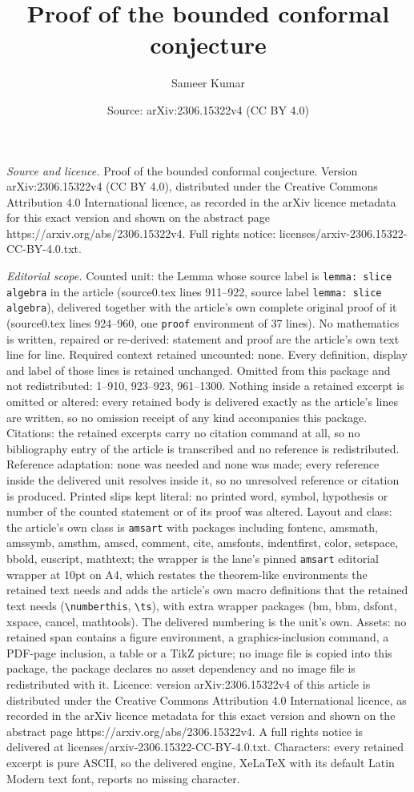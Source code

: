 \documentclass[10pt,a4paper]{amsart}
\title[Proof of the bounded conformal conjecture]{Proof of the bounded conformal conjecture}
\author{Sameer Kumar}
\date{Source: arXiv:2306.15322v4 (CC BY 4.0)}
\begin{document}
\maketitle

\noindent\emph{Source and licence.} Proof of the bounded conformal conjecture. Version arXiv:2306.15322v4 (CC BY 4.0), distributed under the Creative Commons Attribution 4.0 International licence, as recorded in the arXiv licence metadata for this exact version and shown on the abstract page https://arxiv.org/abs/2306.15322v4. Full rights notice: licenses/arxiv-2306.15322-CC-BY-4.0.txt.\par\smallskip

\noindent\textit{Editorial scope.} Counted unit: the Lemma whose source label is \texttt{lemma: slice algebra} in the article (source0.tex lines 911--922, source label \texttt{lemma: slice algebra}), delivered together with the article's own complete original proof of it (source0.tex lines 924--960, one \texttt{proof} environment of 37 lines). No mathematics is written, repaired or re-derived: statement and proof are the article's own text line for line. Required context retained uncounted: none. Every definition, display and label of those lines is retained unchanged. Omitted from this package and not redistributed: 1--910, 923--923, 961--1300. Nothing inside a retained excerpt is omitted or altered: every retained body is delivered exactly as the article's lines are written, so no omission receipt of any kind accompanies this package. Citations: the retained excerpts carry no citation command at all, so no bibliography entry of the article is transcribed and no reference is redistributed. Reference adaptation: none was needed and none was made; every reference inside the delivered unit resolves inside it, so no unresolved reference or citation is produced. Printed slips kept literal: no printed word, symbol, hypothesis or number of the counted statement or of its proof was altered. Layout and class: the article's own class is \texttt{amsart} with packages including fontenc, amsmath, amssymb, amsthm, amscd, comment, cite, amsfonts, indentfirst, color, setspace, bbold, euscript, mathtext; the wrapper is the lane's pinned \texttt{amsart} editorial wrapper at 10pt on A4, which restates the theorem-like environments the retained text needs and adds the article's own macro definitions that the retained text needs (\texttt{\textbackslash numberthis}, \texttt{\textbackslash ts}), with extra wrapper packages (bm, bbm, dsfont, xspace, cancel, mathtools). The delivered numbering is the unit's own. Assets: no retained span contains a figure environment, a graphics-inclusion command, a PDF-page inclusion, a table or a TikZ picture; no image file is copied into this package, the package declares no asset dependency and no image file is redistributed with it. Licence: version arXiv:2306.15322v4 of this article is distributed under the Creative Commons Attribution 4.0 International licence, as recorded in the arXiv licence metadata for this exact version and shown on the abstract page https://arxiv.org/abs/2306.15322v4. A full rights notice is delivered at licenses/arxiv-2306.15322-CC-BY-4.0.txt. Characters: every retained excerpt is pure ASCII, so the delivered engine, XeLaTeX with its default Latin Modern text font, reports no missing character.
\end{document}
